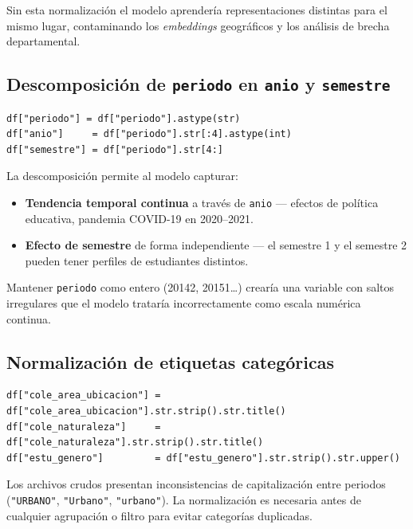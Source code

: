 \documentclass[12pt, a4paper]{article}
\begin{document}
Sin esta normalización el modelo aprendería representaciones distintas para el
mismo lugar, contaminando los \textit{embeddings} geográficos y los análisis de
brecha departamental.

\subsection{Descomposición de \texttt{periodo} en \texttt{anio} y \texttt{semestre}}

\begin{lstlisting}
df["periodo"] = df["periodo"].astype(str)
df["anio"]     = df["periodo"].str[:4].astype(int)
df["semestre"] = df["periodo"].str[4:]
\end{lstlisting}

La descomposición permite al modelo capturar:

\begin{itemize}
  \item \textbf{Tendencia temporal continua} a través de \texttt{anio} —
        efectos de política educativa, pandemia COVID-19 en 2020--2021.
  \item \textbf{Efecto de semestre} de forma independiente — el semestre 1 y
        el semestre 2 pueden tener perfiles de estudiantes distintos.
\end{itemize}

Mantener \texttt{periodo} como entero (20142, 20151\ldots) crearía una variable
con saltos irregulares que el modelo trataría incorrectamente como escala
numérica continua.

\subsection{Normalización de etiquetas categóricas}

\begin{lstlisting}
df["cole_area_ubicacion"] = df["cole_area_ubicacion"].str.strip().str.title()
df["cole_naturaleza"]     = df["cole_naturaleza"].str.strip().str.title()
df["estu_genero"]         = df["estu_genero"].str.strip().str.upper()
\end{lstlisting}

Los archivos crudos presentan inconsistencias de capitalización entre periodos
(\texttt{"URBANO"}, \texttt{"Urbano"}, \texttt{"urbano"}). La normalización es
necesaria antes de cualquier agrupación o filtro para evitar categorías duplicadas.

\end{document}
